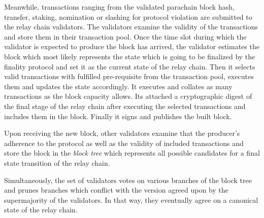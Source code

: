 Meanwhile, transactions ranging from the validated parachain block hash, transfer, staking, nomination or slashing for protocol violation are submitted to the relay chain validators. The validators examine the validity of the transactions and store them in their transaction pool. Once the time slot during which the validator is expected to produce the block has arrived, the validator estimates the block which most likely represents the state which is going to be finalized by the finality protocol and set it as the current state of the relay chain. Then it selects valid transactions with fulfilled pre-requisite from the transaction pool, executes them and updates the state accordingly. It executes and collates as many transactions as the block capacity allows. Its attached a cryptographic digest of the final stage of the relay chain after executing the selected transactions and includes them in the block. Finally it signs and publishes the built block.

Upon receiving the new block, other validators examine that the producer's adherence to the protocol as well as the validity of included transactions and store the block in the \emph{block tree} which represents all possible candidates for a final state transition of the relay chain. 

Simultaneously, the set of validators votes on various branches of the block tree and prunes branches which conflict with the version agreed upon by the supermajority of the validators. In that way, they eventually agree on a canonical state of the relay chain.
